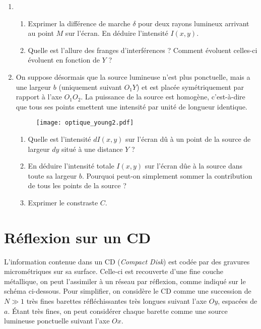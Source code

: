 \begin{enumerate}

\item

\begin{enumerate}

	\item Exprimer la différence de marche $\delta$ pour deux rayons lumineux arrivant au point $M$ sur l'écran. En déduire l'intensité $I(x,y)$.
	
	\item Quelle est l'allure des franges d'interférences ? Comment évoluent celles-ci évoluent en fonction de $Y$ ?

\end{enumerate}

\item On suppose désormais que la source lumineuse n'est plus ponctuelle, mais a une largeur $b$ (uniquement suivant $O_1Y$) et est placée symétriquement par rapport à l'axe $O_1O_2$. La puissance de la source est homogène, c'est-à-dire que tous ses points emettent une intensité par unité de longueur identique.

\begin{figure}[h]
\centering
  \texttt{[image: optique\_young2.pdf]}
\end{figure}

\begin{enumerate}

	\item Quelle est l'intensité $dI(x,y)$ sur l'écran dû à un point de la source de largeur $dy$ situé à une distance $Y$ ?
	
	\item En déduire l'intensité totale $I(x,y)$ sur l'écran dûe à la source dans toute sa largeur $b$. Pourquoi peut-on simplement sommer la contribution de tous les points de la source ?
	
	\item Exprimer le constraste $C$.

\end{enumerate}

\end{enumerate}


\newpage

\section{Réflexion sur un CD}

L'information contenue dans un CD (\textit{Compact Disk}) est codée par des gravures micrométriques sur sa surface. Celle-ci est recouverte d'une fine couche métallique, on peut l'assimiler à un réseau par réflexion, comme indiqué sur le schéma ci-dessous. Pour simplifier, on considère le CD comme une succession de $N\gg1$ très fines barettes réfléchissantes très longues suivant l'axe $Oy$, espacées de $a$. \'Etant très fines, on peut considérer chaque barette comme une source lumineuse ponctuelle suivant l'axe $Ox$. 

